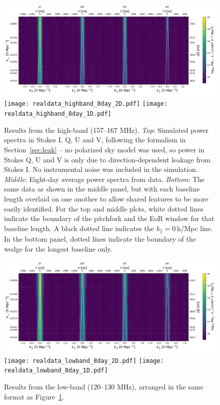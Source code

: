 \documentclass[twocolumn, trackchanges]{aastex61}
\begin{document}
\begin{figure}[h]
\centering
\includegraphics[scale=0.45]{simdata_highband_8day_2D.pdf}
\texttt{[image: realdata\_highband\_8day\_2D.pdf]}
\texttt{[image: realdata\_highband\_8day\_1D.pdf]}
\caption{Results from the high-band (157--167 MHz).  \textit{Top}: Simulated power spectra in Stokes I, Q, U and V, following the formalism in Section~\ref{sec:leak} -- no polarized sky model was used, so power in Stokes Q, U and V is only due to direction-dependent leakage from Stokes I.  No instrumental noise was included in the simulation. \textit{Middle}: Eight-day average power spectra from data. \textit{Bottom}: The same data as shown in the middle panel, but with each baseline length overlaid on one another to allow shared features to be more easily identified.  For the top and middle plots, white dotted lines indicate the boundary of the pitchfork and the EoR window for that baseline length. A black dotted line indicates the $k_{\parallel}=0$\,h/Mpc line.  In the bottom panel, dotted lines indicate the boundary of the wedge for the longest baseline only.
}
\label{fig:pitchforks_highband}
\end{figure}

\begin{figure}[h]
\centering
\includegraphics[scale=0.45]{simdata_lowband_8day_2D.pdf}
\texttt{[image: realdata\_lowband\_8day\_2D.pdf]}
\texttt{[image: realdata\_lowband\_8day\_1D.pdf]}
\caption{Results from the low-band (120--130 MHz), arranged in the same format as Figure~\ref{fig:pitchforks_highband}.}
\label{fig:pitchforks_lowband}
\end{figure}
\end{document}
